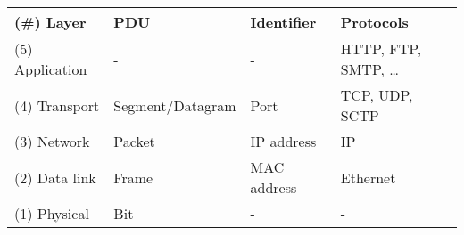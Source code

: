 \begin{tabular}{|l|l|l|l|}
  \hline
  (\#) Layer      & PDU              & Identifier  & Protocols              \\ \hline
  (5) Application & -                & -           & HTTP, FTP, SMTP, \dots \\
  (4) Transport   & Segment/Datagram & Port        & TCP, UDP, SCTP         \\
  (3) Network     & Packet           & IP address  & IP                     \\
  (2) Data link   & Frame            & MAC address & Ethernet               \\
  (1) Physical    & Bit              & -           & -                      \\ \hline
\end{tabular}
